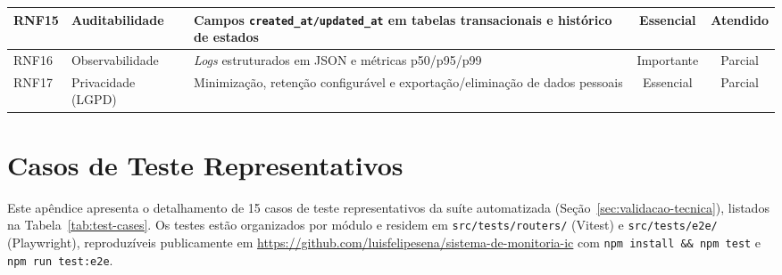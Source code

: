 \documentclass[portuguese]{sbc2025}%
\begin{document}
\begin{table}[H]
\begin{tabular}{|l|p{5.5cm}|p{6.0cm}|c|c|}
    RNF15 & Auditabilidade & Campos \texttt{created\_at/updated\_at} em tabelas transacionais e histórico de estados & Essencial & Atendido \\ \hline
    RNF16 & Observabilidade & \textit{Logs} estruturados em JSON e métricas p50/p95/p99 & Importante & Parcial \\ \hline
    RNF17 & Privacidade (LGPD) & Minimização, retenção configurável e exportação/eliminação de dados pessoais & Essencial & Parcial \\ \hline
  \end{tabular}
\end{table}

\section{Casos de Teste Representativos}
\label{sec:appendix-testcases}

Este apêndice apresenta o detalhamento de 15 casos de teste representativos da suíte automatizada (Seção~\ref{sec:validacao-tecnica}), listados na Tabela~\ref{tab:test-cases}. Os testes estão organizados por módulo e residem em \texttt{src/tests/routers/} (Vitest) e \texttt{src/tests/e2e/} (Playwright), reproduzíveis publicamente em \url{https://github.com/luisfelipesena/sistema-de-monitoria-ic} com \texttt{npm install \&\& npm test} e \texttt{npm run test:e2e}.
\end{document}
